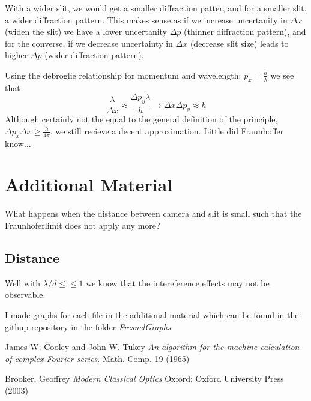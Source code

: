 \documentclass{article}
\begin{document}
With a wider slit, we would get a smaller diffraction patter, and for a smaller slit, a wider diffraction pattern. This makes sense as if we increase uncertanity in $\Delta x$ (widen the slit) we have a lower uncertanity $\Delta p$ (thinner diffraction pattern), and for the converse, if we decrease uncertainty in $\Delta x$ (decrease slit size) leads to higher $\Delta p$ (wider diffraction pattern).

Using the debroglie relationship for momentum and wavelength: $p_x = \frac{h}{\lambda}$ we see that $$\frac{\lambda}{\Delta x} \approx \frac{\Delta p_y  \lambda}{h} \rightarrow \Delta x \Delta p_y \approx h$$ Although certainly not the equal to the general definition of the principle, $\Delta p_x \Delta x \geq \frac{h}{4\pi} $, we still recieve a decent approximation. Little did Fraunhoffer know...

\section{Additional Material}
What happens when the distance between camera and slit is small such that the Fraunhoferlimit does not apply any more?
\subsection{ Distance }
Well with $\lambda / d \leq \leq 1$ we know that the intereference effects may not be observable.

I made graphs for each file in the additional material which can be found in the githup repository in the folder \href{https://github.com/fusionby2030/Numerical_Methods/tree/master/Labs/017E/FresnelGraphs}{\textit{FresnelGraphs}}.

\begin{thebibliography}{9}
James W. Cooley and John W. Tukey
\textit{An algorithm for the machine calculation of complex Fourier series}.
Math. Comp. 19 (1965)

Brooker, Geoffrey
\textit{Modern Classical Optics}
Oxford: Oxford University Press (2003)
\end{thebibliography}
\end{document}
